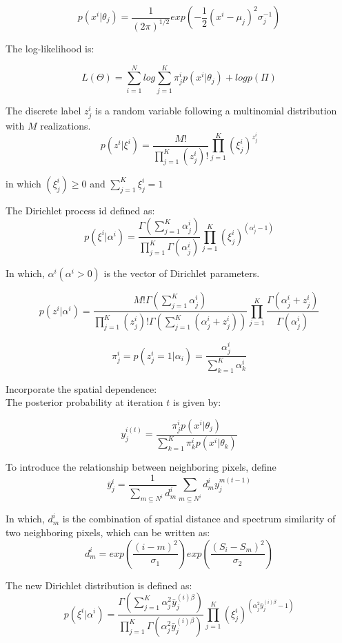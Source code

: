 \documentclass{bioinfo}
\begin{document}
$$p(x^i|\theta_j)=\frac{1}{(2\pi)^{1/2}}exp(-\frac{1}{2}(x^i-\mu_j)^2\sigma_j^{-1})$$

The log-likelihood is:

$$L(\Theta )=\sum_{i=1}^{N}log{\sum_{j=1}^{K}\pi^i_jp(x^i|\theta_j)}+logp(\Pi )$$

The discrete label $z^i_j$ is a random variable following a multinomial distribution with $M$ realizations.\\

$$p(z^i|\xi ^i)=\frac{M!}{\prod_{j=1}^{K}(z^i_j)!}\prod_{j=1}^{K}(\xi ^i_j)^{z^i_j}$$

in which $(\xi ^i_j)\ge0$ and $\sum_{j=1}^{K}\xi ^i_j=1$

The Dirichlet process id defined as:\\

$$p(\xi ^i|\alpha^i)=\frac{\Gamma (\sum_{j=1}^{K}\alpha^i_j)}{\prod_{j=1}^{K}\Gamma (\alpha^i_j)}\prod_{j=1}^{K}(\xi^i_j)^{(\alpha^i_j-1)}$$

In which, $\alpha^i (\alpha^i>0)$ is the vector of Dirichlet parameters.

$$p(z^i|\alpha^i)=\frac{M!\Gamma (\sum_{j=1}^{K}\alpha^i_j)}{\prod_{j=1}^{K}(z^i_j)!\Gamma (\sum_{j=1}^{K}(\alpha^i_j+z^i_j))}\prod_{j=1}^{K}{\frac{\Gamma(\alpha^i_j+z^i_j)}{\Gamma(\alpha^i_j)}}$$

$$\pi^i_j=p(z^i_j=1|\alpha_i)=\frac{\alpha^i_j}{\sum_{k=1}^{K}\alpha^i_k}$$

Incorporate the spatial dependence:\\

The posterior probability at iteration $t$ is given by:


$$y^{i(t)}_j=\frac{\pi^i_jp(x^i|\theta_j)}{\sum_{k=1}^{K}\pi^i_kp(x^i|\theta_k)}$$

To introduce the relationship between neighboring pixels, define\\

$$\bar{y}^{i}_j=\frac{1}{\sum_{m\subseteq N^i}d^i_m}\sum_{m\subseteq N^i}d^i_{m}y^{m(t-1)}_j$$

In which, $d^i_m$ is the combination of spatial distance and spectrum similarity of two neighboring pixels, which can be written as:\\

$$d^i_m=exp(\frac{(i-m)^2}{\sigma_1})exp(\frac{(S_i-S_m)^2}{\sigma_2})$$

The new Dirichlet distribution is defined as:\\
$$p(\xi ^i|\alpha^i)=\frac{\Gamma (\sum_{j=1}^{K}\alpha_j^2 \bar{y}^{(i)\beta}_j)}{\prod_{j=1}^{K}\Gamma (\alpha_j^2 \bar{y}^{(i)\beta}_j)}\prod_{j=1}^{K}(\xi^i_j)^{(\alpha_j^2 \bar{y}^{(i)\beta}_j-1)}$$
\end{document}
